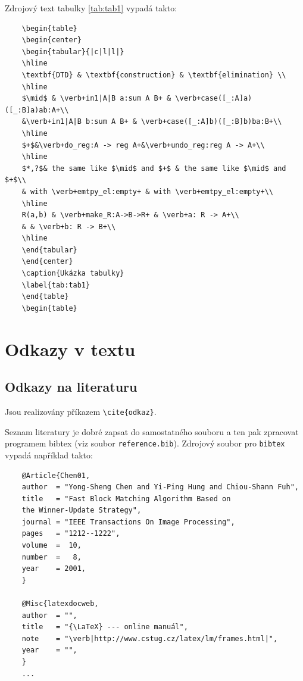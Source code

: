 \documentclass[11pt,twoside,a4paper]{book}
\begin{document}
	Zdrojový text tabulky \ref{tab:tab1} vypadá takto:
	\begin{verbatim}
	\begin{table}
	\begin{center}
	\begin{tabular}{|c|l|l|}
	\hline
	\textbf{DTD} & \textbf{construction} & \textbf{elimination} \\
	\hline
	$\mid$ & \verb+in1|A|B a:sum A B+ & \verb+case([_:A]a)([_:B]a)ab:A+\\
	&\verb+in1|A|B b:sum A B+ & \verb+case([_:A]b)([_:B]b)ba:B+\\
	\hline
	$+$&\verb+do_reg:A -> reg A+&\verb+undo_reg:reg A -> A+\\
	\hline
	$*,?$& the same like $\mid$ and $+$ & the same like $\mid$ and $+$\\
	& with \verb+emtpy_el:empty+ & with \verb+emtpy_el:empty+\\
	\hline
	R(a,b) & \verb+make_R:A->B->R+ & \verb+a: R -> A+\\
	& & \verb+b: R -> B+\\
	\hline
	\end{tabular}
	\end{center}
	\caption{Ukázka tabulky}
	\label{tab:tab1}
	\end{table}
	\begin{table}
	\end{verbatim}
	
	\section{Odkazy v textu}
	\subsection{Odkazy na literaturu}
	Jsou realizovány příkazem \verb|\cite{odkaz}|. 
	
	Seznam literatury je dobré zapsat do samostatného souboru a ten pak zpracovat programem bibtex (viz soubor \verb|reference.bib|). Zdrojový soubor pro \verb|bibtex| vypadá například takto:
	\begin{verbatim}
	@Article{Chen01,
	author  = "Yong-Sheng Chen and Yi-Ping Hung and Chiou-Shann Fuh",
	title   = "Fast Block Matching Algorithm Based on 
	the Winner-Update Strategy",
	journal = "IEEE Transactions On Image Processing",
	pages   = "1212--1222",
	volume  =  10,
	number  =   8,
	year    = 2001,
	}
	
	@Misc{latexdocweb,
	author  = "",
	title   = "{\LaTeX} --- online manuál",
	note    = "\verb|http://www.cstug.cz/latex/lm/frames.html|",
	year    = "",
	}
	...
	\end{verbatim}
	
\end{document}
